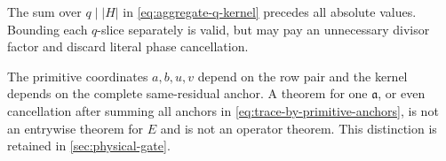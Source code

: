 \begin{remark}
The sum over \(q\mid |H|\) in \eqref{eq:aggregate-q-kernel} precedes all
absolute values.  Bounding each \(q\)-slice separately is valid, but may pay
an unnecessary divisor factor and discard literal phase cancellation.
\end{remark}

\begin{remark}
The primitive coordinates \(a,b,u,v\) depend on the row pair and the
kernel depends on the complete same-residual anchor.  A theorem for one
\(\mathfrak a\), or even cancellation after summing all anchors in
\eqref{eq:trace-by-primitive-anchors}, is not an entrywise theorem for
\(E\) and is not an operator theorem.  This distinction is retained in
\cref{sec:physical-gate}.
\end{remark}
